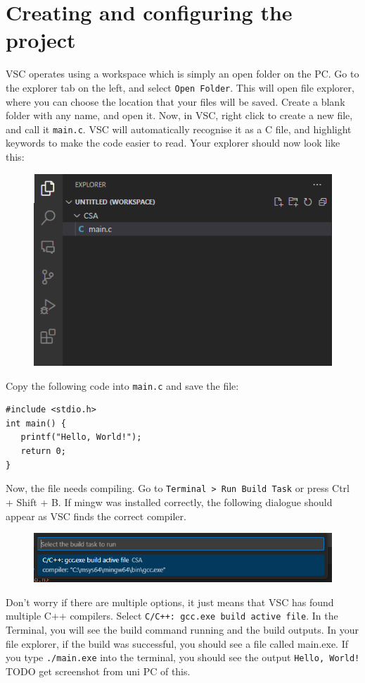 \documentclass{article}
\begin{document}
\section{Creating and configuring the project}\label{Section_3}

VSC operates using a workspace which is simply an open folder on the PC. Go to the explorer tab on the left, and select \texttt{Open Folder}. This will open file explorer, where you can choose the location that your files will be saved. Create a blank folder with any name, and open it. Now, in VSC, right click to create a new file, and call it \texttt{main.c}. VSC will automatically recognise it as a C file, and highlight keywords to make the code easier to read. Your explorer should now look like this:
\begin{figure}[H]
    \centering
    \includegraphics[width=0.5\linewidth]{explorer.png}
    \label{fig:enter-label}
\end{figure}

Copy the following code into \texttt{main.c} and save the file:

\begin{verbatim}
#include <stdio.h> 
int main() {
   printf("Hello, World!");
   return 0;
}
\end{verbatim}

Now, the file needs compiling. Go to \verb|Terminal > Run Build Task| or press Ctrl + Shift + B. If mingw was installed correctly, the following dialogue should appear as VSC finds the correct compiler.

\begin{figure}[h]
    \centering
    \includegraphics[width=0.5\linewidth]{Compiler.png}
    \label{fig:enter-label}
\end{figure}

Don't worry if there are multiple options, it just means that VSC has found multiple C++ compilers. Select \verb|C/C++: gcc.exe build active file|. In the Terminal, you will see the build command running and the build outputs. In your file explorer, if the build was successful, you should see a file called main.exe. If you type \verb|./main.exe| into the terminal, you should see the output \verb|Hello, World!|
TODO get screenshot from uni PC of this. 
\end{document}
